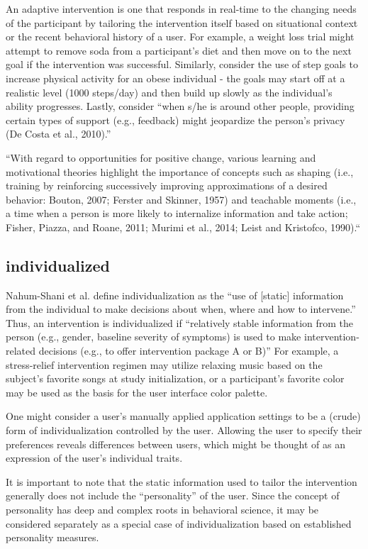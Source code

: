 \documentclass[runningheads,a4paper]{llncs}
\begin{document}
An adaptive intervention is one that responds in real-time to the changing needs of the participant by tailoring the intervention itself based on situational context or the recent behavioral history of a user. 
For example, a weight loss trial might attempt to remove soda from a participant’s diet and then move on to the next goal if the intervention was successful.
Similarly, consider the use of step goals to increase physical activity for an obese individual - the goals may start off at a realistic level (1000 steps/day) and then build up slowly as the individual’s ability progresses.
Lastly, consider “when s/he is around other people, providing certain types of support (e.g., feedback) might jeopardize the person’s privacy (De Costa et al., 2010).” \cite{nahum2014}

“With regard to opportunities for positive change, various learning and motivational theories highlight the importance of concepts such as shaping (i.e., training by reinforcing successively improving approximations of a desired behavior: Bouton, 2007; Ferster and Skinner, 1957) and teachable moments (i.e., a time when a person is more likely to internalize information and take action; Fisher, Piazza, and Roane, 2011; Murimi et al., 2014; Leist and Kristofco, 1990).“ \cite{nahum2014}
\subsection{individualized}
Nahum-Shani et al. define individualization as the “use of [static] information from the individual to make decisions about when, where and how to intervene.” \cite{nahum2014}
Thus, an intervention is individualized if “relatively stable information from the person (e.g., gender, baseline severity of symptoms) is used to make intervention-related decisions (e.g., to offer intervention package A or B)” \cite{nahum2014}
For example, a stress-relief intervention regimen may utilize relaxing music based on the subject’s favorite songs at study initialization, or a participant’s favorite color may be used as the basis for the user interface color palette.

One might consider a user’s manually applied application settings to be a (crude) form of individualization controlled by the user.
Allowing the user to specify their preferences reveals differences between users, which might be thought of as an expression of the user’s individual traits.

It is important to note that the static information used to tailor the intervention generally does not include the “personality” of the user.
Since the concept of personality has deep and complex roots in behavioral science, it may be considered separately as a special case of individualization based on established personality measures.
\end{document}
